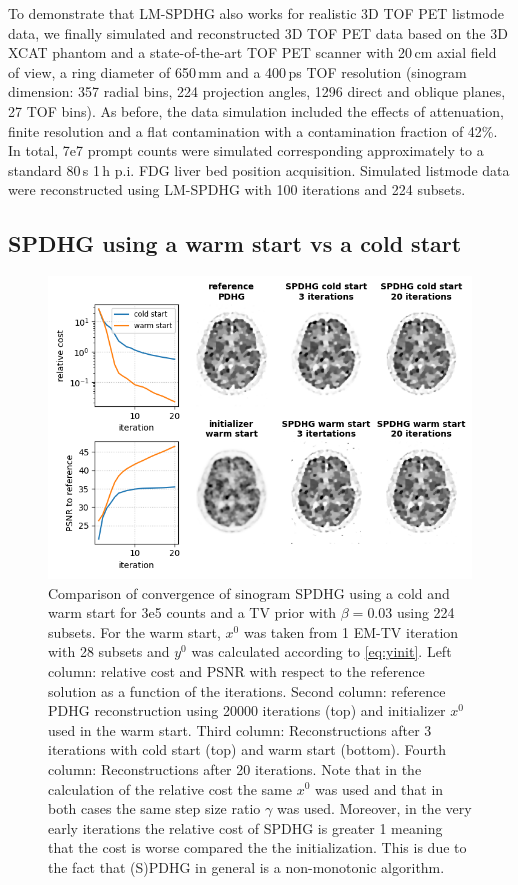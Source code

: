 To demonstrate that LM-SPDHG also works for realistic 3D TOF PET listmode data,
we finally simulated and reconstructed 3D TOF PET data based on the 3D XCAT \cite{Segars2010} phantom 
and a state-of-the-art
TOF PET scanner with 20\,cm axial field of view, a ring diameter of 650\,mm and a 400\,ps TOF 
resolution (sinogram dimension: 357 radial bins, 224 projection angles, 1296 direct and  
oblique planes, 27 TOF bins).
As before, the data simulation included the effects of attenuation, finite resolution and a
flat contamination with a contamination fraction of 42\%.
In total, 7e7 prompt counts were simulated corresponding approximately to a standard 
80\,s 1\,h p.i. FDG liver bed position acquisition.
Simulated listmode data were reconstructed using LM-SPDHG with 100 iterations and 224 subsets. 

\subsection*{SPDHG using a warm start vs a cold start}

\begin{figure}
  \centering
    \includegraphics[width=0.7\columnwidth]{./figure2_SPDHG_init_3.0E+05_224_3.0E-02_3.0E+00.png}
  \caption{Comparison of convergence of sinogram SPDHG using a cold and warm start
           for 3e5 counts and a TV prior with $\beta = 0.03$ using 224 subsets.
           For the warm start, $x^0$ was taken from 1 EM-TV iteration with 28 subsets
           and $y^0$ was calculated according to \eqref{eq:yinit}.
           Left column: relative cost and PSNR with respect to the reference solution as
           a function of the iterations.
           Second column: reference PDHG reconstruction using 20000 iterations (top) and
           initializer $x^0$ used in the warm start.
           Third column: Reconstructions after 3 iterations with cold start (top) and warm
           start (bottom).
           Fourth column: Reconstructions after 20 iterations.
           Note that in the calculation of the relative cost the same $x^0$ was used
           and that in both cases the same step size ratio $\gamma$ was used.
           Moreover, in the very early iterations the relative cost of SPDHG is greater 1
           meaning that the cost is worse compared the the initialization.
           This is due to the fact that (S)PDHG in general is a non-monotonic algorithm.
          }
  \label{fig:warm_start}
\end{figure}



